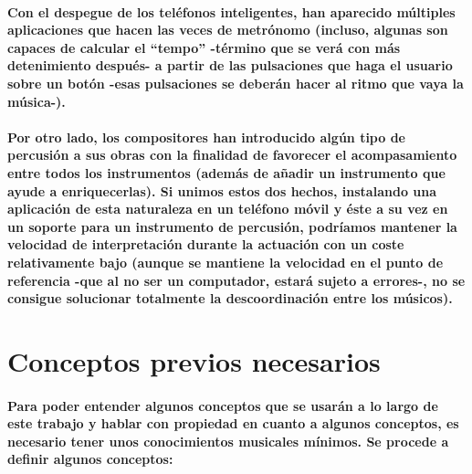 \paragraph{
Con el despegue de los teléfonos inteligentes, han aparecido múltiples aplicaciones que hacen las veces de metrónomo (incluso, algunas son capaces de calcular el “tempo” -término que se verá con más detenimiento después- a partir de las pulsaciones que haga el usuario sobre un botón -esas pulsaciones se deberán hacer al ritmo que vaya la música-).
}

\paragraph{
Por otro lado, los compositores han introducido algún tipo de percusión a sus obras con la finalidad de favorecer el acompasamiento entre todos los instrumentos (además de añadir un instrumento que ayude a enriquecerlas). Si unimos estos dos hechos, instalando una aplicación de esta naturaleza en un teléfono móvil y éste a su vez en un soporte para un instrumento de percusión, podríamos mantener la velocidad de interpretación durante la actuación con un coste relativamente bajo (aunque se mantiene la velocidad en el punto de referencia -que al no ser un computador, estará sujeto a errores-, no se consigue solucionar totalmente la descoordinación entre los músicos).
}

\section{Conceptos previos necesarios}
\paragraph{
Para poder entender algunos conceptos que se usarán a lo largo de este trabajo y hablar con propiedad en cuanto a algunos conceptos, es necesario tener unos conocimientos musicales mínimos. Se procede a definir algunos conceptos:
}

